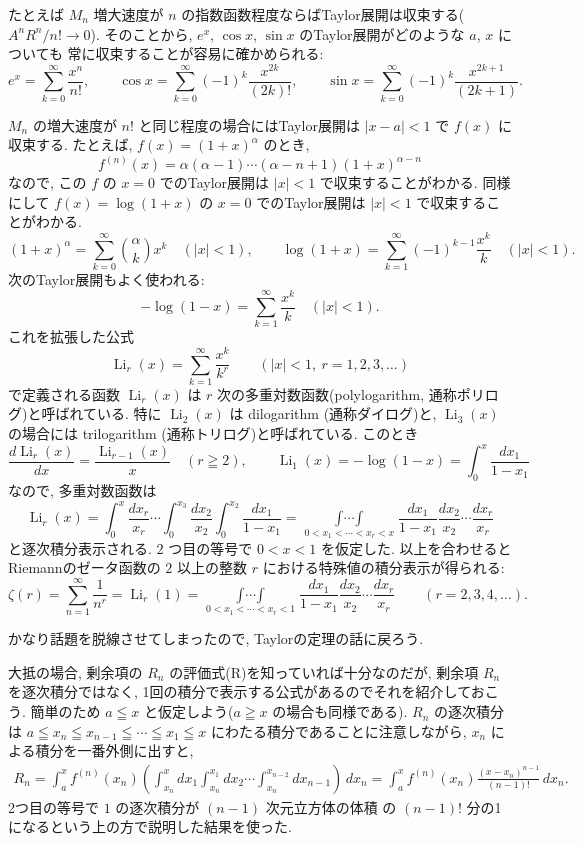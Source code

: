 \documentclass[12pt,twoside]{jarticle}
\newcommand\Li{\operatorname{Li}}
\theoremstyle{jplain}
\theoremstyle{jplain}
\theoremstyle{jplain}
\numberwithin{theorem}{section}
\numberwithin{equation}{section}
\numberwithin{figure}{section}
\numberwithin{table}{section}
\begin{document}
たとえば $M_n$ 増大速度が $n$ の指数函数程度ならばTaylor展開は収束する($A^nR^n/n!\to 0$).
そのことから, $e^x$, $\cos x$, $\sin x$ のTaylor展開がどのような $a$, $x$ についても
常に収束することが容易に確かめられる:
\[
e^x = \sum_{k=0}^\infty \frac{x^n}{n!}, \qquad
\cos x = \sum_{k=0}^\infty (-1)^k \frac{x^{2k}}{(2k)!}, \qquad
\sin x = \sum_{k=0}^\infty (-1)^k \frac{x^{2k+1}}{(2k+1)}.
\]

$M_n$ の増大速度が $n!$ と同じ程度の場合にはTaylor展開は $|x-a|<1$ で $f(x)$ に収束する.
たとえば, $f(x)=(1+x)^\alpha$ のとき,
\[
f^{(n)}(x)=\alpha(\alpha-1)\cdots(\alpha-n+1)(1+x)^{\alpha-n}
\]
なので, この $f$ の $x=0$ でのTaylor展開は $|x|<1$ で収束することがわかる.
同様にして $f(x)=\log(1+x)$ の $x=0$ でのTaylor展開は $|x|<1$ で収束することがわかる.
\[
(1+x)^\alpha = \sum_{k=0}^\infty\binom{\alpha}{k}x^k \quad (|x|<1), \qquad
\log(1+x) = \sum_{k=1}^\infty(-1)^{k-1}\frac{x^k}{k} \quad (|x|<1).
\]
次のTaylor展開もよく使われる:
\[
-\log(1-x) = \sum_{k=1}^\infty \frac{x^k}{k} \quad (|x|<1).
\]
これを拡張した公式
\[
\Li_r(x)=\sum_{k=1}^\infty\frac{x^k}{k^r} \qquad (|x|<1,\ r=1,2,3,\ldots)
\]
で定義される函数 $\Li_r(x)$ は 
$r$ 次の多重対数函数(polylogarithm, 通称ポリログ)と呼ばれている.
特に $\Li_2(x)$ は dilogarithm (通称ダイログ)と, 
$\Li_3(x)$ の場合には trilogarithm (通称トリログ)と呼ばれている.
このとき
\[
\frac{d\Li_r(x)}{dx}=\frac{\Li_{r-1}(x)}{x} \quad (r\geqq 2), \qquad 
\Li_1(x)=-\log(1-x)=\int_0^x \frac{dx_1}{1-x_1}
\]
なので, 多重対数函数は 
\[
\operatorname{Li}_r(x)
=\int_0^x\frac{dx_r}{x_r}\cdots\int_0^{x_3}\frac{dx_2}{x_2}
\int_0^{x_2}\frac{dx_1}{1-x_1}
=\mathop{\int\cdots\int}\limits_{0<x_1<\cdots<x_r<x}
\frac{dx_1}{1-x_1}\frac{dx_2}{x_2}\cdots\frac{dx_r}{x_r}
\]
と逐次積分表示される. 
$2$ つ目の等号で $0<x<1$ を仮定した.
以上を合わせるとRiemannのゼータ函数の
$2$ 以上の整数 $r$ における特殊値の積分表示が得られる:
\[
\zeta(r)
=\sum_{n=1}^\infty\frac{1}{n^r}
=\Li_r(1)
=\mathop{\int\cdots\int}\limits_{0<x_1<\cdots<x_r<1}
\frac{dx_1}{1-x_1}\frac{dx_2}{x_2}\cdots\frac{dx_r}{x_r}
\qquad (r=2,3,4,\ldots).
\]

かなり話題を脱線させてしまったので, Taylorの定理の話に戻ろう.

大抵の場合, 剰余項の $R_n$ の評価式(R)を知っていれば十分なのだが, 
剰余項 $R_n$ を逐次積分ではなく, 
1回の積分で表示する公式があるのでそれを紹介しておこう.
簡単のため $a\leqq x$ と仮定しよう($a\geqq x$ の場合も同様である).
$R_n$ の逐次積分は $a\leqq x_n\leqq x_{n-1}\leqq\cdots\leqq x_1\leqq x$
にわたる積分であることに注意しながら, $x_n$ による積分を一番外側に出すと, 
\begin{align*}
R_n 
= \int_a^x f^{(n)}(x_n)\left(\int_{x_n}^x\!\!\!dx_1\int_{x_n}^{x_1}\!\!\!dx_2\cdots\int_{x_n}^{x_{n-2}}\!\!\!dx_{n-1}\right)\,dx_n
= \int_a^x f^{(n)}(x_n)\frac{(x-x_n)^{n-1}}{(n-1)!}\,dx_n.
\end{align*}
2つ目の等号で $1$ の逐次積分が $(n-1)$ 次元立方体の体積
の $(n-1)!$ 分の1になるという上の方で説明した結果を使った.
\end{document}
